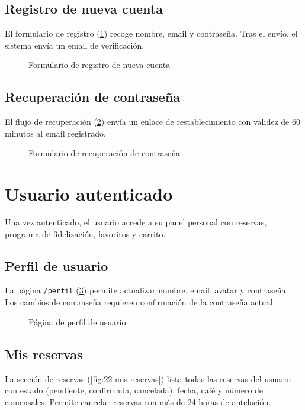 \documentclass[12pt,a4paper,twoside,openright]{report}
\begin{document}
\subsection{Registro de nueva cuenta}
El formulario de registro (\cref{fig:14-registro-form}) recoge nombre, email y
contraseña. Tras el envío, el sistema envía un email de verificación.

\begin{figure}[H]
  \centering
  \fbox{\rule{0pt}{6cm}\rule{12cm}{0pt}}
  \caption{Formulario de registro de nueva cuenta}
  \label{fig:14-registro-form}
\end{figure}

\subsection{Recuperación de contraseña}
El flujo de recuperación (\cref{fig:15-forgot-password}) envía un enlace de
restablecimiento con validez de 60 minutos al email registrado.

\begin{figure}[H]
  \centering
  \fbox{\rule{0pt}{6cm}\rule{12cm}{0pt}}
  \caption{Formulario de recuperación de contraseña}
  \label{fig:15-forgot-password}
\end{figure}

\section{Usuario autenticado}
\label{sec:manual-usuario}

Una vez autenticado, el usuario accede a su panel personal con reservas, programa de
fidelización, favoritos y carrito.

\subsection{Perfil de usuario}
La página \texttt{/perfil} (\cref{fig:19-perfil}) permite actualizar nombre, email,
avatar y contraseña. Los cambios de contraseña requieren confirmación de la contraseña
actual.

\begin{figure}[H]
  \centering
  \fbox{\rule{0pt}{6cm}\rule{12cm}{0pt}}
  \caption{Página de perfil de usuario}
  \label{fig:19-perfil}
\end{figure}

\subsection{Mis reservas}
La sección de reservas (\cref{fig:22-mis-reservas}) lista todas las reservas del
usuario con estado (pendiente, confirmada, cancelada), fecha, café y número de
comensales. Permite cancelar reservas con más de 24 horas de antelación.
\end{document}
